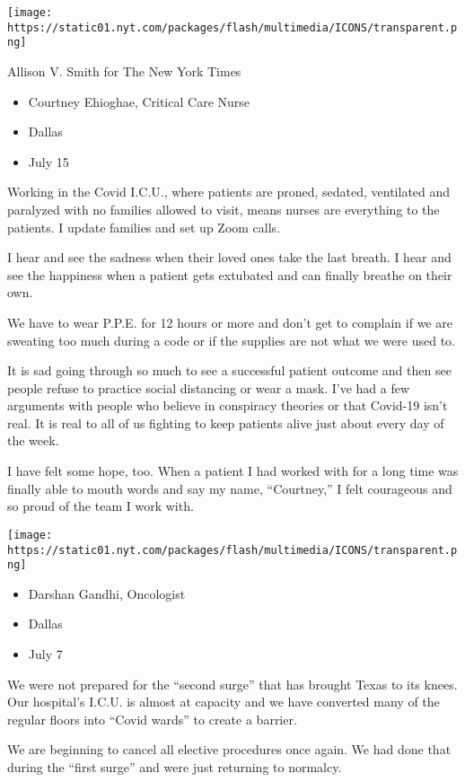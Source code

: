 \texttt{[image: https://static01.nyt.com/packages/flash/multimedia/ICONS/transparent.png]}

Allison V. Smith for The New York Times

\begin{itemize}
\tightlist
\item
  Courtney Ehioghae, Critical Care Nurse
\item
  Dallas
\item
  July 15
\end{itemize}

Working in the Covid I.C.U., where patients are proned, sedated,
ventilated and paralyzed with no families allowed to visit, means nurses
are everything to the patients. I update families and set up Zoom calls.

I hear and see the sadness when their loved ones take the last breath. I
hear and see the happiness when a patient gets extubated and can finally
breathe on their own.

We have to wear P.P.E. for 12 hours or more and don't get to complain if
we are sweating too much during a code or if the supplies are not what
we were used to.

It is sad going through so much to see a successful patient outcome and
then see people refuse to practice social distancing or wear a mask.
I've had a few arguments with people who believe in conspiracy theories
or that Covid-19 isn't real. It is real to all of us fighting to keep
patients alive just about every day of the week.

I have felt some hope, too. When a patient I had worked with for a long
time was finally able to mouth words and say my name, ``Courtney,'' I
felt courageous and so proud of the team I work with.

\texttt{[image: https://static01.nyt.com/packages/flash/multimedia/ICONS/transparent.png]}

\begin{itemize}
\tightlist
\item
  Darshan Gandhi, Oncologist
\item
  Dallas
\item
  July 7
\end{itemize}

We were not prepared for the ``second surge'' that has brought Texas to
its knees. Our hospital's I.C.U. is almost at capacity and we have
converted many of the regular floors into ``Covid wards'' to create a
barrier.

We are beginning to cancel all elective procedures once again. We had
done that during the ``first surge'' and were just returning to
normalcy.

